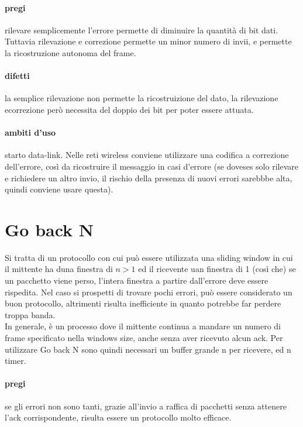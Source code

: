 \documentclass{article}
\begin{document}
\paragraph{pregi} rilevare semplicemente l'errore permette di diminuire la
quantità di bit dati. Tuttavia rilevazione e correzione permette un minor numero
di invii, e permette la ricostruzione autonoma del frame.

\paragraph{difetti} la semplice rilevazione non permette la ricostruizione del
dato, la rilevazione ecorrezione però necessita del doppio dei bit per poter
essere attuata.

\paragraph{ambiti d'uso} starto data-link. Nelle reti wireless conviene
utilizzare una codifica a correzione dell'errore, così da ricostruire il
messaggio in casi d'errore (se doveses solo rilevare e richiedere un altro
invio, il rischio della presenza di nuovi errori sarebbbe alta, quindi conviene
usare questa).

\section{Go back N}

Si tratta di un protocollo con cui può essere utilizzata una sliding window in
cui il mittente ha duna finestra di $n>1$ ed il ricevente uan finestra di 1
(così che) se un pacchetto viene perso, l'intera finestra a partire dall'errore
deve essere rispedita. Nel caso si prospetti di trovare pochi errori, può essere
considerato un buon protocollo, altrimenti risulta inefficiente in quanto
potrebbe far perdere troppa banda.\\
In generale, è un processo dove il mittente continua a mandare un numero di
frame specificato nella windows size, anche senza aver ricevuto alcun ack. Per
utilizzare Go back N sono quindi necessari un buffer grande n per ricevere, ed
n timer.

\paragraph{pregi} se gli errori non sono tanti, grazie all'invio a raffica di
pacchetti senza attenere l'ack corrispondente, risulta essere un protocollo
molto efficace.
\end{document}
